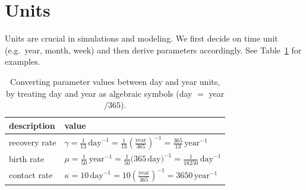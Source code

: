 \section{Units}
Units are crucial in simulations and modeling. We first decide on time
unit (e.g.~year, month, week) and then derive parameters
accordingly. See Table~\ref{tab:units} for examples.

\begin{table}[h]
\centering
\footnotesize
\begin{tabular}{l p{10.5cm}}
\hline
description & value \\
\hline
recovery rate &
$\gamma = \frac{1}{13}\,\text{day}^{-1} = \frac{1}{13}\left(\frac{\text{year}}{365}\right)^{-1}= \frac{365}{13}\,\text{year}^{-1}$ \\
%
%
%
birth rate & 
$\mu = \frac{1}{50}\,\text{year}^{-1} = \frac{1}{50}\big(365\,\text{day}\big)^{-1} = \frac{1}{18250}\,\text{day}^{-1}$ \\
%
%
%
contact rate &
$\kappa = 10\,\text{day}^{-1} =10\left(\frac{\text{year}}{365}\right)^{-1} = 3650\,\text{year}^{-1}$
\\ \hline
\end{tabular}
\caption{Converting parameter values between day and year units, by
treating day and year as algebraic symbols (day $=$ year$/365$).}
\label{tab:units}
\end{table}
